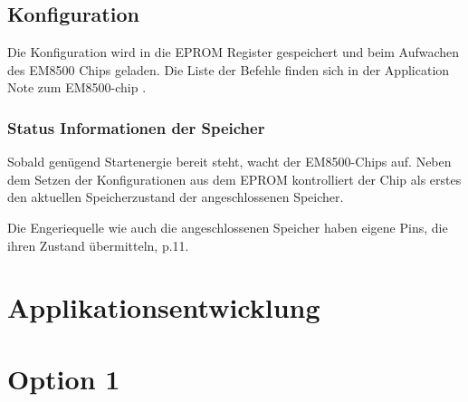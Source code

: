 \subsection{Konfiguration}

Die Konfiguration wird in die EPROM Register gespeichert und beim Aufwachen des EM8500 Chips geladen.
Die Liste der Befehle finden sich in der Application Note zum EM8500-chip \cite{config_EM85}.


\subsubsection{Status Informationen der Speicher}

Sobald genügend Startenergie bereit steht, wacht der EM8500-Chips auf. Neben dem Setzen der Konfigurationen aus dem EPROM kontrolliert der Chip als erstes den aktuellen Speicherzustand der angeschlossenen Speicher.

Die Engeriequelle wie auch die angeschlossenen Speicher haben eigene Pins, die ihren Zustand übermitteln\cite{datasheet_EM85}, p.11. 

\section{Applikationsentwicklung}

\section{Option 1}






